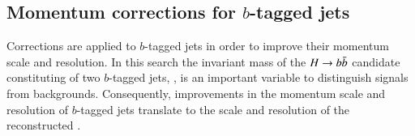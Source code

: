 

\subsection{Momentum corrections for $b$-tagged jets}
\label{sec:bjet_momentum_corrections}

Corrections are applied to $b$-tagged jets in order to improve their
momentum scale and resolution. In this search the invariant mass of
the $H \to b\bar{b}$ candidate constituting of two $b$-tagged jets,
\mBB, is an important variable to distinguish signals from
backgrounds. Consequently, improvements in the momentum scale and
resolution of $b$-tagged jets translate to the scale and resolution of
the reconstructed \mBB.

